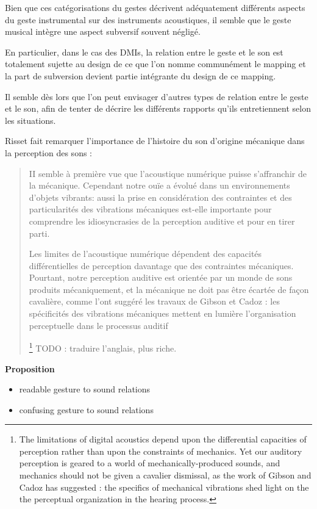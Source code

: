 Bien que ces catégorisations du gestes décrivent adéquatement différents aspects du geste instrumental sur des instruments acoustiques, il semble que le geste musical intègre une aspect subversif souvent négligé.

En particulier, dans le cas des \glspl{DMI}, la relation entre le geste et le son est totalement sujette au design de ce que l'on nomme communément le \gls{mapping} et la part de subversion devient partie intégrante du design de ce mapping. 


Il semble dès lors que l'on peut envisager d'autres types de relation entre le geste et le son, afin de tenter de décrire les différents rapports qu'ils entretiennent selon les situations.

Risset fait remarquer l'importance de l'histoire du son d'origine mécanique dans la perception des sons \cite{risset_son_1992}: 

\begin{quotation}
II semble à première vue que l'acoustique numérique puisse s'affranchir de la mécanique. Cependant notre ouïe a évolué dans un environnements d'objets vibrants: aussi la prise en considération des contraintes et des particularités des vibrations mécaniques est-elle importante pour comprendre les idiosyncrasies de la perception auditive et pour en tirer parti.

Les limites de l'acoustique numérique dépendent des capacités différentielles de perception davantage que des contraintes mécaniques. Pourtant, notre perception auditive est orientée par un monde de sons produits mécaniquement, et la mécanique ne doit pas être écartée de façon cavalière, comme l'ont suggéré les travaux de Gibson et Cadoz : les spécificités des vibrations mécaniques mettent en lumière l'organisation perceptuelle dans le processus auditif


\footnote{The limitations of digital acoustics depend upon the differential capacities of perception rather than upon the constraints of mechanics. Yet our auditory perception is geared to a world of mechanically-produced sounds, and mechanics should not be given a cavalier dismissal, as the work of Gibson and Cadoz has suggested : the specifics of mechanical vibrations shed light on the the perceptual organization in the hearing process.} TODO : traduire l'anglais, plus riche.
\end{quotation}


\textbf{Proposition}
\vspace{-1em}
\begin{itemize}[noitemsep]
\item readable gesture to sound relations
\item confusing gesture to sound relations
\end{itemize}

